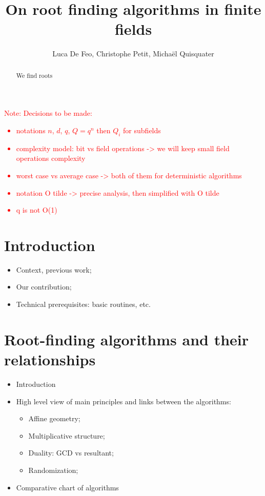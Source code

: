 \documentclass{article}
\author{Luca De Feo, Christophe Petit, Micha\"el Quisquater}
\title{On root finding algorithms in finite fields}
\newcounter{algo}
\newcommand{\Notes}[1]{\textcolor{red}{Note: #1}}
\begin{document}
\maketitle
\begin{abstract}
  We find roots
\end{abstract}


\Notes{
Decisions to be made:
\begin{itemize}
\item notations $n$, $d$, $q$, $Q=q^n$ then $Q_i$ for subfields
\item complexity model: bit vs field operations -> we will keep small field operations complexity
\item worst case vs average case -> both of them for deterministic algorithms
\item notation O tilde -> precise analysis, then simplified with O tilde
\item q is not O(1)
\end{itemize}
}




\section{Introduction}
\label{sec:introduction}

\begin{itemize}
\item Context, previous work;
\item Our contribution;
\item Technical prerequisites: basic routines, etc.
\end{itemize}




\section{Root-finding algorithms and their relationships}
\label{sec:root-find-algor}

\begin{itemize}
\item Introduction
\item High level view of main principles and links between the
  algorithms:
  \begin{itemize}
  \item Affine geometry;
  \item Multiplicative structure;
  \item Duality: GCD vs resultant;
  \item Randomization;
  \end{itemize}
\item Comparative chart of algorithms
\end{itemize}
\end{document}
